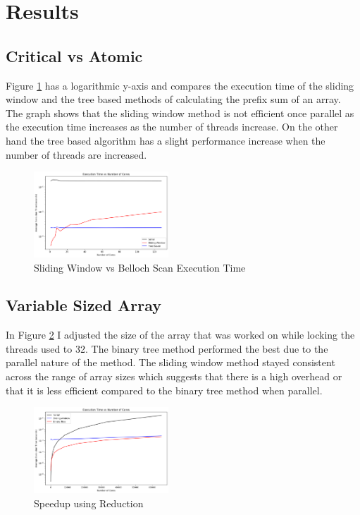 \documentclass[conference]{IEEEtran}
\begin{document}
\section{Results}
\subsection{Critical vs Atomic}
Figure \ref{fig:prefix} has a logarithmic y-axis and compares the execution time of the sliding window and the tree based methods of calculating the prefix sum of an array. 
The graph shows that the sliding window method is not efficient once parallel as the execution time increases as the number of threads increase.
On the other hand the tree based algorithm has a slight performance increase when the number of threads are increased. 
\begin{figure}[H]
    \centering
    \includegraphics[width=0.45\textwidth]{../img/prefix.png}
    \caption{Sliding Window vs Belloch Scan Execution Time}
    \label{fig:prefix}
\end{figure}

\subsection{Variable Sized Array}
In Figure \ref{fig:variable} I adjusted the size of the array that was worked on while locking the threads used to 32. The binary tree method performed the best due to the parallel nature of the method.
The sliding window method stayed consistent across the range of array sizes which suggests that there is a high overhead or that it is less efficient compared to the binary tree method when parallel.
\begin{figure}[H]
    \centering
    \includegraphics[width=0.45\textwidth]{../img/variable_size.png}
    \caption{Speedup using Reduction}
    \label{fig:variable}
\end{figure}
\end{document}
